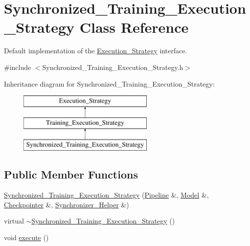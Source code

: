 \hypertarget{class_synchronized___training___execution___strategy}{
\section{Synchronized\_\-Training\_\-Execution\_\-Strategy Class Reference}
\label{class_synchronized___training___execution___strategy}
}


Default implementation of the \hyperlink{class_execution___strategy}{Execution\_\-Strategy} interface.  




{\ttfamily \#include $<$Synchronized\_\-Training\_\-Execution\_\-Strategy.h$>$}

Inheritance diagram for Synchronized\_\-Training\_\-Execution\_\-Strategy:\begin{figure}[H]
\begin{center}
\leavevmode
\includegraphics[height=3cm]{class_synchronized___training___execution___strategy}
\end{center}
\end{figure}
\subsection*{Public Member Functions}
\begin{DoxyCompactItemize}
\item 
\hyperlink{class_synchronized___training___execution___strategy_a8535193e2ad9ec0b80dbaf2ba82af453}{Synchronized\_\-Training\_\-Execution\_\-Strategy} (\hyperlink{class_pipeline}{Pipeline} \&, \hyperlink{class_model}{Model} \&, \hyperlink{class_checkpointer}{Checkpointer} \&, \hyperlink{class_synchronizer___helper}{Synchronizer\_\-Helper} \&)
\item 
virtual \hyperlink{class_synchronized___training___execution___strategy_a055e17959d75203bfdcc5919439eddd7}{$\sim$Synchronized\_\-Training\_\-Execution\_\-Strategy} ()
\item 
void \hyperlink{class_synchronized___training___execution___strategy_a77e2fa3f19b544fa4392c9ed56c504e4}{execute} ()
\end{DoxyCompactItemize}


